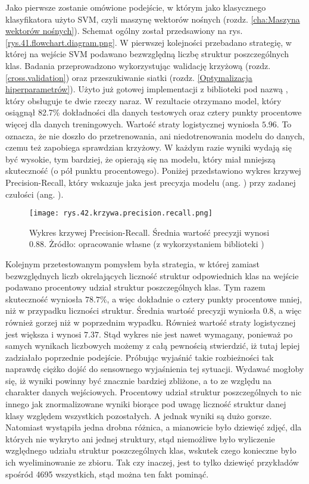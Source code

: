 Jako pierwsze zostanie omówione podejście, w którym jako klasycznego klasyfikatora użyto SVM, czyli maszynę wektorów nośnych (rozdz. \ref{cha:Maszyna wektorów nośnych}). Schemat ogólny został przedsawiony na rys. \ref{rys.41.flowchart.diagram.png}. W pierwszej kolejności przebadano strategię, w której na wejście SVM podawano bezwzględną liczbę struktur poszczególnych klas. Badania przeprowadzono wykorzystując walidację krzyżową (rozdz. \ref{cross.validation}) oraz przeszukiwanie siatki (rozdz. \ref{Optymalizacja hiperparametrów}). Użyto już gotowej implementacji z biblioteki  pod nazwą , który obsługuje te dwie rzeczy naraz. W rezultacie otrzymano model, który osiągnął 82.7\% dokładności dla danych testowych oraz cztery punkty procentowe więcej dla danych treningowych. Wartość straty logistycznej wyniosła $5.96$. To oznacza, że nie doszło do przetrenowania, ani niedotrenowania modelu do danych, czemu też zapobiega sprawdzian krzyżowy. W każdym razie wyniki wydają się być wysokie, tym bardziej, że opierają się na modelu, który miał mniejszą skuteczność (o pół punktu procentowego). Poniżej przedstawiono wykres krzywej Precision-Recall, który wskazuje jaka jest precyzja modelu (ang. ) przy zadanej czułości (ang. ). 
\begin{figure}[h]
    \centering
    \texttt{[image: rys.42.krzywa.precision.recall.png]}
    \caption{Wykres krzywej Precision-Recall. Średnia wartość precyzji wynosi 0.88. Żródło: opracowanie własne (z wykorzystaniem biblioteki )}
    \label{rys.42.krzywa.precision.recall.png}
\end{figure}

Kolejnym przetestowanym pomysłem była strategia, w której zamiast bezwzględnych liczb okrelających liczność struktur odpowiednich klas na wejście podawano procentowy udział struktur poszczególnych klas. Tym razem skuteczność wyniosła $78.7\%$, a więc dokładnie o cztery punkty procentowe mniej, niż w przypadku liczności struktur. Średnia wartość precyzji wyniosła $0.8$, a więc również gorzej niż w poprzednim wypadku. Również wartość straty logistycznej jest większa i wynosi $7.37$. Stąd wykres nie jest nawet wymagany, ponieważ po samych wynikach liczbowych możemy z całą pewnością stwierdzić, iż tutaj lepiej zadziałało poprzednie podejście. Próbując wyjaśnić takie rozbieżności tak naprawdę ciężko dojść do sensownego wyjaśnienia tej sytuacji. Wydawać mogłoby się, iż wyniki powinny być znacznie bardziej zbliżone, a to ze względu na charakter danych wejściowych. Procentowy udział struktur poszczególnych to nic innego jak znormalizowane wyniki biorące pod uwagę liczność struktur danej klasy względem wszystkich pozostałych. A jednak wyniki są dużo gorsze. Natomiast wystąpiła jedna drobna różnica, a mianowicie było dziewięć zdjęć, dla których nie wykryto ani jednej struktury, stąd niemożliwe było wyliczenie względnego udziału struktur poszczególnych klas, wskutek czego konieczne było ich wyeliminowanie ze zbioru. Tak czy inaczej, jest to tylko dziewięć przykładów spośród 4695 wszystkich, stąd można ten fakt pominąć. 

